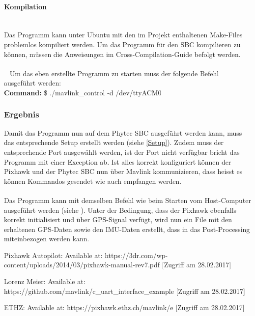 \documentclass[12pt]{article} %
\begin{document}
	\paragraph{Kompilation}\ \\
	Das Programm kann unter Ubuntu mit den im Projekt enthaltenen Make-Files problemlos kompiliert werden. Um das Programm für den SBC kompilieren zu können, müssen die Anweisungen im Cross-Compilation-Guide befolgt werden.\\ \\\
	\noindent
	Um das eben erstellte Programm zu starten muss der folgende Befehl ausgeführt werden:
	\\[0.2cm]
	\noindent\hspace*{30mm} \textbf{Command:} \$ ./mavlink\_control -d /dev/ttyACM0\\ \label{Exec Mav}
	
	\subsubsection{Ergebnis}
	Damit das Programm nun auf dem Phytec SBC ausgeführt werden kann, muss das entsprechende Setup erstellt werden (siehe \ref{Setup}). Zudem muss der entsprechende Port ausgewählt werden, ist der Port nicht verfügbar bricht das Programm mit einer Exception ab. Ist alles korrekt konfiguriert können der Pixhawk und der Phytec SBC nun über Mavlink kommunizieren, dass heisst es können Kommandos gesendet wie auch empfangen werden.\\
	\\
	Das Programm kann mit demselben Befehl wie beim Starten vom Host-Computer ausgeführt werden (siehe \pageref{Exec Mav}). Unter der Bedingung, dass der Pixhawk ebenfalls korrekt initialisiert und über GPS-Signal verfügt, wird nun ein File mit den erhaltenen GPS-Daten sowie den IMU-Daten erstellt, dass in das Post-Processing miteinbezogen werden kann.
	

\newpage
\renewcommand\refname{Literaturverzeichnis}
\begin{thebibliography}{99} %
	\raggedright
	
	Pixhawk Autopilot:
	\newblock [online] Available at: https://3dr.com/wp-content/uploads/2014/03/pixhawk-manual-rev7.pdf [Zugriff am 28.02.2017]
	
	Lorenz Meier:
	\newblock [online] Available at: https://github.com/mavlink/c\_uart\_interface\_example [Zugriff am 28.02.2017]
	
	ETHZ:
	\newblock [online] Available at: https://pixhawk.ethz.ch/mavlink/e [Zugriff am 28.02.2017]



\end{thebibliography}

	
\end{document}

